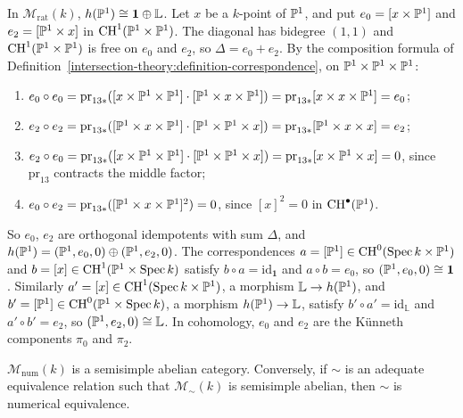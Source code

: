 \begin{example}\label{standard-conjectures:example-projective-line}
In $\mathcal{M}_{\mathrm{rat}}(k)$, $h(\mathbb{P}^1) \cong \mathbf{1} \oplus \mathbb{L}$. Let $x$ be a $k$-point of $\mathbb{P}^1$, and put $e_0 = [x \times \mathbb{P}^1]$ and $e_2 = [\mathbb{P}^1 \times x]$ in $\operatorname{CH}^1(\mathbb{P}^1 \times \mathbb{P}^1)$. The diagonal has
bidegree $(1,1)$ and $\operatorname{CH}^1(\mathbb{P}^1 \times \mathbb{P}^1)$ is free on $e_0$ and $e_2$, so $\Delta = e_0 + e_2$. By the composition formula of Definition~\ref{intersection-theory:definition-correspondence}, on
$\mathbb{P}^1 \times \mathbb{P}^1 \times \mathbb{P}^1$:
\begin{enumerate}
\item $e_0 \circ e_0 = \mathrm{pr}_{13*}([x \times \mathbb{P}^1 \times \mathbb{P}^1] \cdot [\mathbb{P}^1 \times x \times \mathbb{P}^1]) = \mathrm{pr}_{13*}[x \times x \times \mathbb{P}^1] = e_0$;
\item $e_2 \circ e_2 = \mathrm{pr}_{13*}([\mathbb{P}^1 \times x \times \mathbb{P}^1] \cdot [\mathbb{P}^1 \times \mathbb{P}^1 \times x]) = \mathrm{pr}_{13*}[\mathbb{P}^1 \times x \times x] = e_2$;
\item $e_2 \circ e_0 = \mathrm{pr}_{13*}([x \times \mathbb{P}^1 \times \mathbb{P}^1] \cdot [\mathbb{P}^1 \times \mathbb{P}^1 \times x]) = \mathrm{pr}_{13*}[x \times \mathbb{P}^1 \times x] = 0$, since $\mathrm{pr}_{13}$ contracts the middle factor;
\item $e_0 \circ e_2 = \mathrm{pr}_{13*}([\mathbb{P}^1 \times x \times \mathbb{P}^1]^2) = 0$, since $[x]^2 = 0$ in $\operatorname{CH}^\bullet(\mathbb{P}^1)$.
\end{enumerate}
So $e_0$, $e_2$ are orthogonal idempotents with sum $\Delta$, and $h(\mathbb{P}^1) = (\mathbb{P}^1, e_0, 0) \oplus (\mathbb{P}^1, e_2, 0)$. The correspondences $a = [\mathbb{P}^1] \in \operatorname{CH}^0(\operatorname{Spec} k \times \mathbb{P}^1)$ and $b = [x] \in \operatorname{CH}^1(\mathbb{P}^1 \times \operatorname{Spec} k)$
satisfy $b \circ a = \mathrm{id}_{\mathbf{1}}$ and $a \circ b = e_0$, so $(\mathbb{P}^1, e_0, 0) \cong \mathbf{1}$. Similarly $a' = [x] \in \operatorname{CH}^1(\operatorname{Spec} k \times \mathbb{P}^1)$, a morphism $\mathbb{L} \to h(\mathbb{P}^1)$, and $b' = [\mathbb{P}^1] \in \operatorname{CH}^0(\mathbb{P}^1 \times \operatorname{Spec} k)$,
a morphism $h(\mathbb{P}^1) \to \mathbb{L}$, satisfy $b' \circ a' = \mathrm{id}_{\mathbb{L}}$ and $a' \circ b' = e_2$, so $(\mathbb{P}^1, e_2, 0) \cong \mathbb{L}$. In cohomology, $e_0$ and $e_2$ are the K\"unneth components $\pi_0$ and $\pi_2$.
\end{example}

\begin{theorem}[Jannsen]\label{standard-conjectures:theorem-jannsen}
$\mathcal{M}_{\mathrm{num}}(k)$ is a semisimple abelian category. Conversely, if $\sim$ is an adequate equivalence relation such that $\mathcal{M}_\sim(k)$ is semisimple abelian, then $\sim$ is numerical
equivalence.
\end{theorem}

